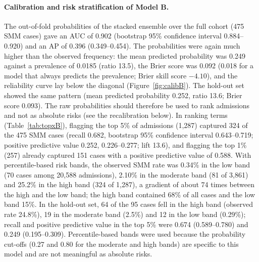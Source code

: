 \documentclass[healthcare,article,submit,pdftex,moreauthors]{Definitions/mdpi}
\begin{document}
\paragraph{Calibration and risk stratification of Model B.}
The out-of-fold probabilities of the stacked ensemble over the full cohort (475 SMM cases) gave an AUC of 0.902
(bootstrap 95\% confidence interval 0.884--0.920) and an AP of 0.396 (0.349--0.454). The probabilities were
again much higher than the observed frequency: the mean predicted probability was 0.249 against a prevalence of 0.0185
(ratio 13.5), the Brier score was 0.092 (0.018 for a model that always predicts the prevalence; Brier skill score $-4.10$),
and the reliability curve lay below the diagonal (Figure~\ref{fig:calibB}). The hold-out set showed the same pattern (mean predicted
probability 0.252, ratio 13.6; Brier score 0.093). The raw probabilities should therefore be used to rank admissions and not as absolute risks (see the recalibration below).
In ranking terms (Table~\ref{tab:topxB}), flagging the top 5\% of admissions (1{,}287) captured 324 of the 475 SMM cases
(recall 0.682, bootstrap 95\% confidence interval 0.643--0.719; positive predictive value 0.252, 0.226--0.277; lift 13.6),
and flagging the top 1\% (257) already captured 151 cases with a positive predictive value of 0.588. With percentile-based
risk bands, the observed SMM rate was 0.34\% in the low band (70 cases among 20{,}588 admissions), 2.10\% in the moderate band
(81 of 3{,}861) and 25.2\% in the high band (324 of 1{,}287), a gradient of about 74 times between the high and the low band; the
high band contained 68\% of all cases and the low band 15\%. In the hold-out set, 64 of the 95 cases fell in the high band (observed rate 24.8\%),
19 in the moderate band (2.5\%) and 12 in the low band (0.29\%); recall and positive predictive value in the top 5\% were 0.674 (0.589--0.780) and 0.249 (0.195--0.309).
Percentile-based bands were used because the probability cut-offs (0.27 and 0.80 for the moderate and high bands) are specific to this
model and are not meaningful as absolute risks.
\end{document}

